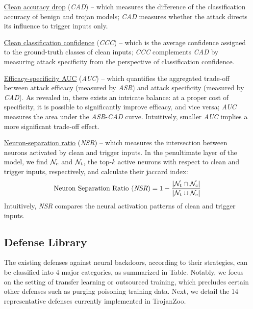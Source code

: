 \documentclass[compsoc,conference,a4paper,10pt,times]{IEEEtran}
\newcommand{\system}{{\sc \small TrojanZoo}\xspace}
\newcommand{\asr}{{\em \small ASR}\xspace}
\newcommand{\cad}{{\em \small CAD}\xspace}
\newcommand{\ccc}{{\em \small CCC}\xspace}
\newcommand{\auc}{{\em \small AUC}\xspace}
\newcommand{\nsr}{{\em \small NSR}\xspace}
\begin{document}
\vspace{1pt}
{\underline{Clean accuracy drop}} (\cad) -- which measures the difference of the classification accuracy of benign and trojan models; \cad measures whether the attack directs its influence to trigger inputs only.

\vspace{1pt}
{\underline{Clean classification confidence}} (\ccc) -- which is the average confidence assigned to the ground-truth classes of clean inputs; \ccc complements \cad by measuring attack specificity from the perspective of classification confidence.

\vspace{1pt}
{\underline{Efficacy-specificity AUC}} (\auc) -- which quantifies the aggregated trade-off between attack efficacy (measured by \asr) and attack specificity (measured by \cad). As revealed in, there exists an intricate balance: at a proper cost of specificity, it is possible to significantly improve efficacy, and vice versa; \auc measures the area under the \asr-\cad curve. Intuitively, smaller \auc implies a more significant trade-off effect.

\vspace{1pt}
{\underline{Neuron-separation ratio}} (\nsr) -- which measures the intersection between neurons activated by clean and trigger inputs. In the penultimate layer of the model, we find ${\mathcal{N}}_\mathrm{c}$ and ${\mathcal{N}}_\mathrm{t}$, the top-$k$ active neurons with respect to clean and trigger inputs, respectively, and calculate their jaccard index:
\begin{align}
\text{\small Neuron Separation Ratio (\nsr)} = 1- \frac{|\gN_\mathrm{t} \cap \gN_\mathrm{c}|}{|\gN_\mathrm{t} \cup \gN_\mathrm{c}|}
\end{align}
Intuitively, \nsr compares the neural activation patterns of clean and trigger inputs.





\subsection{Defense Library}


The existing defenses against neural backdoors, according to their strategies, can be classified into 4 major categories, as summarized in Table. Notably, we focus on the setting of transfer learning or outsourced training, which precludes certain other defenses such as purging poisoning training data. Next, we detail the 14 representative defenses currently implemented in \system.
\end{document}
